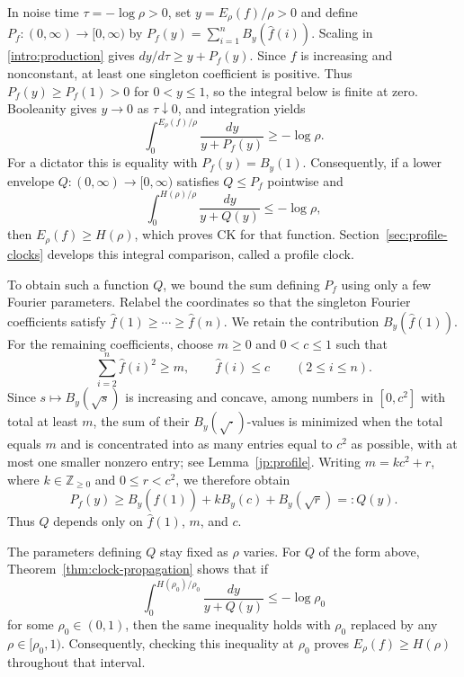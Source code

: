 \documentclass[11pt,letterpaper]{amsart}
\newcommand{\1}{\mathbf 1}
\numberwithin{equation}{section}
\begin{document}
In noise time $\tau=-\log\rho>0$, set $y=E_\rho(f)/\rho>0$ and
define $P_f:(0,\infty)\to[0,\infty)$ by
$P_f(y)=\sum_{i=1}^n B_y(\widehat f(i))$. Scaling in \eqref{intro:production} gives
$dy/d\tau\ge y+P_f(y)$.
Since $f$ is increasing and nonconstant, at least one singleton
coefficient is positive. Thus $P_f(y)\ge P_f(1)>0$ for
$0<y\le1$, so the integral below is finite at zero.
Booleanity gives $y\to0$ as $\tau\downarrow0$, and integration yields
\begin{equation}\label{intro:clock}
 \int_0^{E_\rho(f)/\rho}\frac{dy}{y+P_f(y)}\ge-\log\rho.
\end{equation}
For a dictator this is equality with $P_f(y)=B_y(1)$.
Consequently, if a lower envelope $Q:(0,\infty)\to[0,\infty)$
satisfies $Q\le P_f$ pointwise and
\[
 \int_0^{H(\rho)/\rho}\frac{dy}{y+Q(y)}\le-\log\rho,
\]
then $E_\rho(f)\ge H(\rho)$, which proves CK for that function.
Section~\ref{sec:profile-clocks} develops this integral comparison,
called a profile clock.

To obtain such a function $Q$, we bound the sum defining $P_f$ using
only a few Fourier parameters. Relabel the coordinates so that the singleton Fourier coefficients satisfy $\widehat f(1) 
\ge \cdots \ge \widehat f(n)$. We retain the contribution $B_y(\widehat f(1))$.
For the remaining coefficients, choose $m\ge0$ and $0<c\le1$
such that
\[
 \sum_{i=2}^n\widehat f(i)^2\ge m,
 \qquad
\widehat f(i)\le c\qquad(2\le i\le n).
\]
Since $s\mapsto B_y(\sqrt{s})$ is increasing and concave,
among numbers in $[0,c^2]$ with total at least $m$, the sum of
their $B_y(\sqrt{\cdot})$-values is minimized when the total
equals $m$ and is concentrated into as many entries equal to
$c^2$ as possible, with at most one smaller nonzero entry;
see Lemma~\ref{jp:profile}.
Writing $m=kc^2+r$, where $k\in\mathbb Z_{\ge0}$ and
$0\le r<c^2$, we therefore obtain
\[
 P_f(y)\ge
 B_y(\widehat f(1))+kB_y(c)+B_y(\sqrt r)=:Q(y).
\]
Thus $Q$ depends only on $\widehat f(1)$, $m$, and $c$.

The parameters defining $Q$ stay fixed as $\rho$ varies.
For $Q$ of the form above,
Theorem~\ref{thm:clock-propagation} shows that if
\[
 \int_0^{H(\rho_0)/\rho_0}\frac{dy}{y+Q(y)}
 \le -\log\rho_0
\]
for some $\rho_0\in(0,1)$, then the same inequality holds
with $\rho_0$ replaced by any $\rho\in[\rho_0,1)$.
Consequently, checking this inequality at $\rho_0$ proves
$E_\rho(f)\ge H(\rho)$ throughout that interval.
\end{document}
